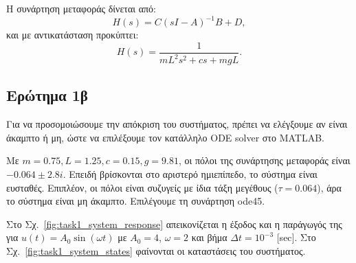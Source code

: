 \documentclass[a4paper,12pt]{article}
\begin{document}
Η συνάρτηση μεταφοράς δίνεται από:
\begin{equation}
    H(s) = C (sI-A)^{-1}B + D,
    \label{eq:transfer_function_formula}
\end{equation}
και με αντικατάσταση προκύπτει:
\begin{equation}
    H(s) = \frac{1}{mL^2s^2 + cs + mgL}.
    \label{eq:transfer_function}
\end{equation}

\subsection*{Ερώτημα 1β}
Για να προσομοιώσουμε την απόκριση του συστήματος, πρέπει να ελέγξουμε αν είναι άκαμπτο ή μη, ώστε να επιλέξουμε τον κατάλληλο ODE solver στο MATLAB.

Με $m = 0.75, L = 1.25, c = 0.15, g = 9.81$, οι πόλοι της συνάρτησης μεταφοράς είναι $-0.064\pm2.8i$. Επειδή βρίσκονται στο αριστερό ημιεπίπεδο, το σύστημα είναι ευσταθές. Επιπλέον, οι πόλοι είναι συζυγείς με ίδια τάξη μεγέθους ($\tau=0.064$), άρα το σύστημα είναι μη άκαμπτο. Επιλέγουμε τη συνάρτηση ode45.

Στο Σχ.~\ref{fig:task1_system_response} απεικονίζεται η έξοδος και η παράγωγός της για $u(t) = A_0 \sin(\omega t)$ με $A_0 = 4$, $\omega = 2$ και βήμα $\Delta t = 10^{-3}$ [sec]. Στο Σχ.~\ref{fig:task1_system_states} φαίνονται οι καταστάσεις του συστήματος.
\end{document}
